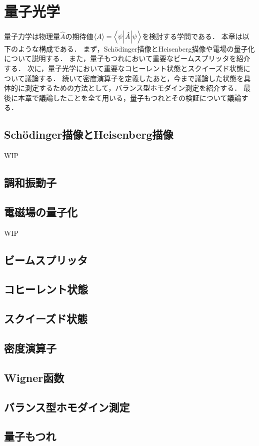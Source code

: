 \documentclass{report}
\begin{document}
  \maketitle
  \tableofcontents
  \chapter{量子光学}
    量子力学は物理量$\hat{A}$の期待値$\ev{A} = \mel**{\psi}{\hat{A}}{\psi}$を検討する学問である．
    本章は以下のような構成である．
    まず，Sch\"odinger描像とHeisenberg描像や電場の量子化について説明する．
    また，量子もつれにおいて重要なビームスプリッタを紹介する．
    次に，量子光学において重要なコヒーレント状態とスクイーズド状態について議論する．
    続いて密度演算子を定義したあと，今まで議論した状態を具体的に測定するための方法として，バランス型ホモダイン測定を紹介する．
    最後に本章で議論したことを全て用いる，量子もつれとその検証について議論する．
    \section{Sch\"odinger描像とHeisenberg描像}
      WIP
    \section{調和振動子}
      
    \section{電磁場の量子化}
      WIP
    \section{ビームスプリッタ}
      
    \section{コヒーレント状態}
      
    \section{スクイーズド状態}
      
    \section{密度演算子}
    \section{Wigner函数}
    \section{バランス型ホモダイン測定}
    \section{量子もつれ}
\end{document}
